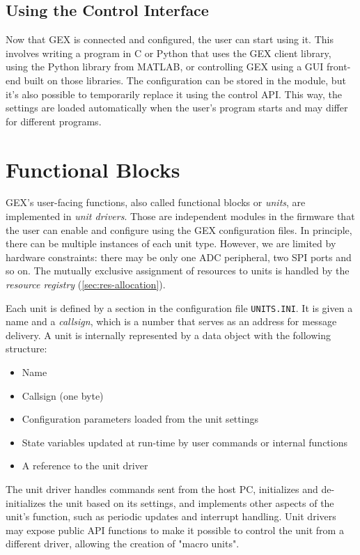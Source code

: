 \subsection{Using the Control Interface}

Now that GEX is connected and configured, the user can start using it. This involves writing a program in C or Python that uses the GEX client library, using the Python library from MATLAB, or controlling GEX using a \gls{GUI} front-end built on those libraries. The configuration can be stored in the module, but it's also possible to temporarily replace it using the control \gls{API}. This way, the settings are loaded automatically when the user's program starts and may differ for different programs.

\section{Functional Blocks} \label{sec:units-function}

GEX's user-facing functions, also called functional blocks or \textit{units}, are implemented in \textit{unit drivers}. Those are independent modules in the firmware that the user can enable and configure using the GEX configuration files. In principle, there can be multiple instances of each unit type. However, we are limited by hardware constraints: there may be only one \gls{ADC} peripheral, two \gls{SPI} ports and so on. The mutually exclusive assignment of resources to units is handled by the \textit{resource registry} (\ref{sec:res-allocation}).

Each unit is defined by a section in the configuration file \verb|UNITS.INI|. It is given a name and a \textit{callsign}, which is a number that serves as an address for message delivery. A unit is internally represented by a data object with the following structure:

\begin{itemize}
	\item Name
	\item Callsign (one byte)
	\item Configuration parameters loaded from the unit settings
	\item State variables updated at run-time by user commands or internal functions
	\item A reference to the unit driver
\end{itemize}

The unit driver handles commands sent from the host \gls{PC}, initializes and de-initializes the unit based on its settings, and implements other aspects of the unit's function, such as periodic updates and interrupt handling. Unit drivers may expose public \gls{API} functions to make it possible to control the unit from a different driver, allowing the creation of "macro units".

